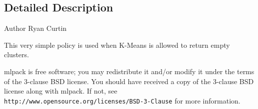 \subsection{Detailed Description}
\begin{DoxyAuthor}{Author}
Ryan Curtin
\end{DoxyAuthor}
This very simple policy is used when K-\/\+Means is allowed to return empty clusters.

mlpack is free software; you may redistribute it and/or modify it under the terms of the 3-\/clause B\+SD license. You should have received a copy of the 3-\/clause B\+SD license along with mlpack. If not, see {\tt http\+://www.\+opensource.\+org/licenses/\+B\+S\+D-\/3-\/\+Clause} for more information. 